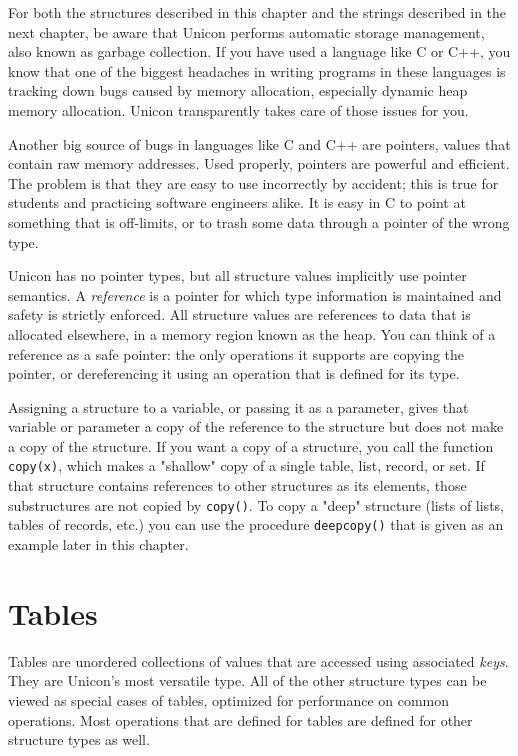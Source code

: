For both the structures described in this chapter and the strings
described in the next chapter, be aware that Unicon performs
automatic storage management, also
known as garbage collection. If you have used
a language like C or C++, you know that one of the biggest headaches in
writing programs in these languages is tracking down bugs caused by
memory allocation, especially dynamic heap
memory allocation. Unicon transparently takes care of those issues for
you.

Another big source of bugs in languages like C and C++ are
pointers, values that contain raw memory addresses. Used properly, pointers are powerful and
efficient. The problem is that they are easy to use incorrectly by
accident; this is true for students and practicing software engineers
alike. It is easy in C to point at something that is off-limits, or to
trash some data through a pointer of the wrong type.

Unicon has no pointer types, but all structure values implicitly
use pointer semantics. A \textit{reference} is a
pointer for which type information is maintained and safety is
strictly enforced. All structure values are references to
data that is allocated elsewhere, in a memory region known as
the heap. You can think of a reference as a safe
pointer: the only operations it supports are copying the pointer, or
dereferencing it using an operation that is defined for its type.

Assigning a structure to a variable, or passing it as a
parameter, gives that variable or parameter a copy of
the reference to the structure but does not make a copy of the
structure. If you want a copy of a structure, you call the function
\texttt{copy(x)}, which makes a "shallow"
copy of a single table, list, record, or set. If that structure
contains references to other structures as its elements, those
substructures are not copied by \texttt{copy()}. To copy a
"deep" structure (lists of lists, tables of
records, etc.) you can use the procedure \texttt{deepcopy()} that is
given as an example later in this chapter.

\section{Tables}

Tables are unordered collections of values that
are accessed using associated \textit{keys}. They are Unicon's most versatile
type. All of the other structure types can be viewed as special cases
of tables, optimized for performance on common operations. Most
operations that are defined for tables are defined for other structure
types as well.

